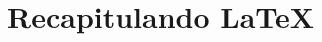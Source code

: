 \documentclass{beamer}
\subtitle{Parte 3: No Solo Documentos de Texto: Presentaciones y Más}
\begin{document}
\begin{frame}
  \titlepage
\end{frame}


\section{Recapitulando \LaTeX{}}
\end{document}
